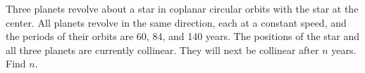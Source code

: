 Three planets revolve about a star in coplanar circular orbits with the star at the center.  All planets revolve in the same direction, each at a constant speed, and the periods of their orbits are 60, 84, and 140 years.  The positions of the star and all three planets are currently collinear.  They will next be collinear after $n$ years.  Find $n$.